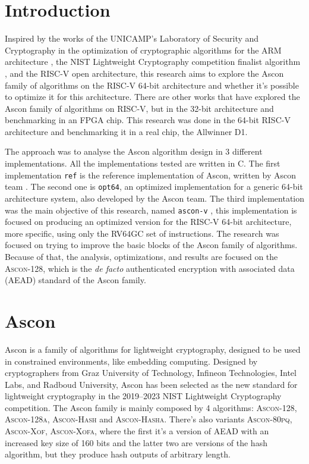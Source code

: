\documentclass[11pt,twoside]{article}
\begin{document}
\section{Introduction}
Inspired by the works of the UNICAMP's Laboratory of Security and Cryptography in the optimization of cryptographic algorithms for the ARM architecture \cite{Fujii2017a}, the NIST Lightweight Cryptography competition finalist algorithm \cite{turan2023status}, and the RISC-V open architecture, this research aims to explore the Ascon family of algorithms \cite{asconv12nist} on the RISC-V 64-bit architecture and whether it's possible to optimize it for this architecture. There are other works that have explored the Ascon family of algorithms on RISC-V, but in the 32-bit architecture and benchmarking in an FPGA chip. This research was done in the 64-bit RISC-V architecture and benchmarking it in a real chip, the Allwinner D1.

The approach was to analyse the Ascon algorithm design in 3 different implementations. All the implementations tested are written in C. The first implementation \texttt{ref} is the reference implementation of Ascon, written by Ascon team \cite{asconc2023}. The second one is \texttt{opt64}, an optimized implementation for a generic 64-bit architecture system, also developed by the Ascon team. The  third implementation was the main objective of this research, named \texttt{ascon-v} \cite{asconv2023}, this implementation is focused on producing an optimized version for the RISC-V 64-bit architecture, more specific, using only the \textsf{RV64GC} set of instructions. The research was focused on trying to improve the basic blocks of the Ascon family of algorithms. Because of that, the analysis, optimizations, and results are focused on the \textsc{Ascon-128}, which is the \textit{de facto} authenticated encryption with associated data (AEAD) standard of the Ascon family.

\section{Ascon}

Ascon is a family of algorithms for lightweight cryptography, designed to be used in constrained environments, like embedding computing. Designed by cryptographers from Graz University of Technology, Infineon Technologies, Intel Labs, and Radboud University, Ascon has been selected as the new standard for lightweight cryptography in the 2019–2023 NIST Lightweight Cryptography competition. The Ascon family is mainly composed by 4 algorithms: \textsc{Ascon-128}, \textsc{Ascon-128a}, \textsc{Ascon-Hash} and \textsc{Ascon-Hasha}. There's also variants \textsc{Ascon-80pq}, \textsc{Ascon-Xof}, \textsc{Ascon-Xofa}, where the first it's a version of AEAD with an increased key size of 160 bits and the latter two are versions of the hash algorithm, but they produce hash outputs of arbitrary length.
\end{document}
